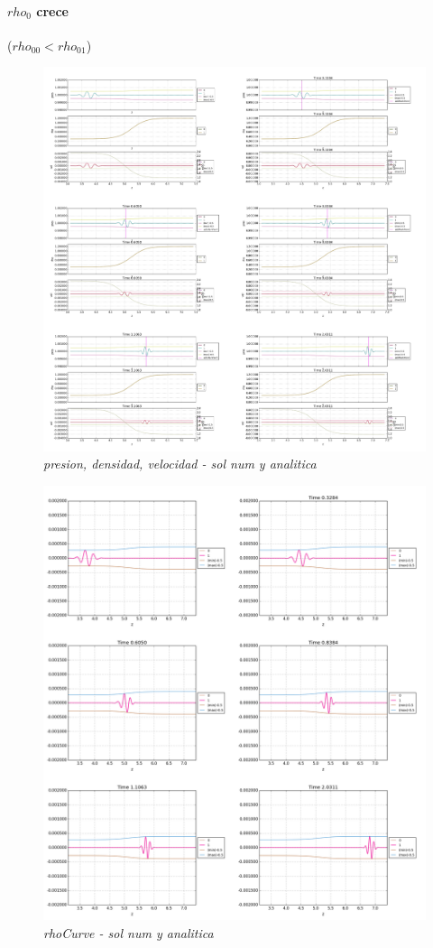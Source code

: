 \documentclass{article}
\begin{document}
\paragraph{$rho_0$ crece} ($rho_{00} < rho_{01}$)
\begin{figure}[!ht]
 \centering
 \includegraphics[scale=0.2]{maininhom2.png}
 \caption{\emph{presion, densidad, velocidad - sol num y analitica}}
\end{figure}

\begin{figure}[!ht]
 \centering
 \includegraphics[scale=0.2]{rhocinhom2.png}
 \caption{\emph{rhoCurve - sol num y analitica}}
\end{figure}
 
\end{document}
